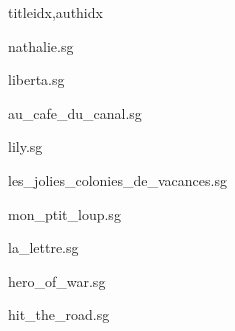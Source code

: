 \documentclass[
    fontsize=7pt
    ]{scrartcl}
\begin{document}
\begin{songs}{titleidx,authidx}

{nathalie.sg}


{liberta.sg}


{au_cafe_du_canal.sg}


{lily.sg}


{les_jolies_colonies_de_vacances.sg}


{mon_ptit_loup.sg}


{la_lettre.sg}


{hero_of_war.sg}


{hit_the_road.sg}



\end{songs}
\end{document}
